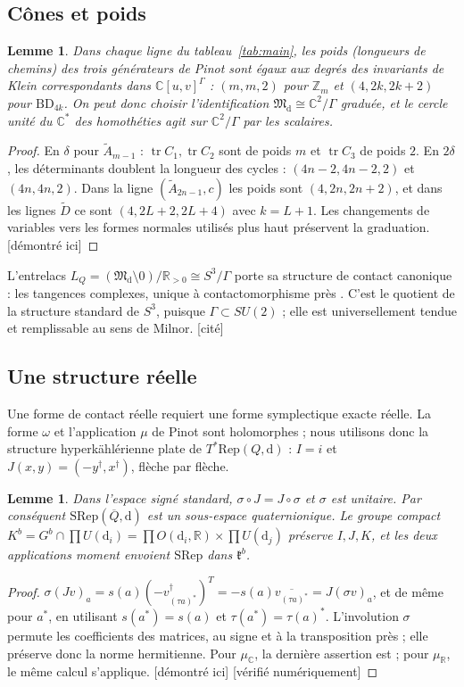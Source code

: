 \documentclass[11pt]{article}
\newtheorem{lemma}[theorem]{Lemme}
\theoremstyle{definition}
\theoremstyle{remark}
\newcommand{\tagP}{\textsf{\small[démontré ici]}}
\newcommand{\tagC}{\textsf{\small[cité]}}
\newcommand{\tagN}{\textsf{\small[vérifié numériquement]}}
\newcommand{\C}{\mathbb{C}}\newcommand{\R}{\mathbb{R}}\newcommand{\Z}{\mathbb{Z}}
\newcommand{\M}{\mathfrak{M}}\newcommand{\Rep}{\mathrm{Rep}}\newcommand{\SRep}{\mathrm{SRep}}
\newcommand{\BD}{\mathrm{BD}}
\begin{document}
\subsection{Cônes et poids}
\begin{lemma}\label{lem:weights}
Dans chaque ligne du tableau~\ref{tab:main}, les poids (longueurs de chemins) des trois générateurs de Pinot sont égaux aux degrés des invariants de Klein correspondants dans $\C[u,v]^\Gamma$ : $(m,m,2)$ pour $\Z_m$ et $(4,2k,2k+2)$ pour $\BD_{4k}$. On peut donc choisir l'identification $\M_{\mathrm d}\cong\C^2/\Gamma$ graduée, et le cercle unité du $\C^*$ des homothéties agit sur $\C^2/\Gamma$ par les scalaires.
\end{lemma}
\begin{proof}
En $\delta$ pour $\widetilde A_{m-1}$ : $\operatorname{tr}C_1,\operatorname{tr}C_2$ sont de poids $m$ et $\operatorname{tr}C_3$ de poids $2$. En $2\delta$, les déterminants doublent la longueur des cycles : $(4n-2,4n-2,2)$ et $(4n,4n,2)$. Dans la ligne $(\widetilde A_{2n-1},c)$ les poids sont $(4,2n,2n+2)$, et dans les lignes $\widetilde D$ ce sont $(4,2L+2,2L+4)$ avec $k=L+1$. Les changements de variables vers les formes normales utilisés plus haut préservent la graduation. \tagP
\end{proof}

L'entrelacs $L_Q=(\M_{\mathrm d}\setminus0)/\R_{>0}\cong S^3/\Gamma$ porte sa structure de contact canonique : les tangences complexes, unique à contactomorphisme près \cite{CNPP06}. C'est le quotient de la structure standard de $S^3$, puisque $\Gamma\subset SU(2)$ ; elle est universellement tendue et remplissable au sens de Milnor. \tagC

\subsection{Une structure réelle}
Une forme de contact réelle requiert une forme symplectique exacte réelle. La forme $\omega$ et l'application $\mu$ de Pinot sont holomorphes ; nous utilisons donc la structure hyperkählérienne plate de $T^*\Rep(Q,\mathrm d)$ : $I=i$ et $J(x,y)=(-y^\dagger,x^\dagger)$, flèche par flèche.

\begin{lemma}\label{lem:quat}
Dans l'espace signé standard, $\sigma\circ J=J\circ\sigma$ et $\sigma$ est unitaire. Par conséquent $\SRep(\overline Q,\mathrm d)$ est un sous-espace quaternionique. Le groupe compact $K^b=G^b\cap\prod U(\mathrm d_i)=\prod O(\mathrm d_i,\R)\times\prod U(\mathrm d_j)$ préserve $I,J,K$, et les deux applications moment envoient $\SRep$ dans $\mathfrak k^b$.
\end{lemma}
\begin{proof}
$\sigma(Jv)_a=s(a)(-v_{(\tau a)^*}^\dagger)^T=-s(a)\overline{v_{(\tau a)^*}}=J(\sigma v)_a$, et de même pour $a^*$, en utilisant $s(a^*)=s(a)$ et $\tau(a^*)=\tau(a)^*$. L'involution $\sigma$ permute les coefficients des matrices, au signe et à la transposition près ; elle préserve donc la norme hermitienne. Pour $\mu_\C$, la dernière assertion est \cite[prop.~2.11]{Pin26} ; pour $\mu_\R$, le même calcul s'applique. \tagP{} \tagN
\end{proof}
\end{document}
